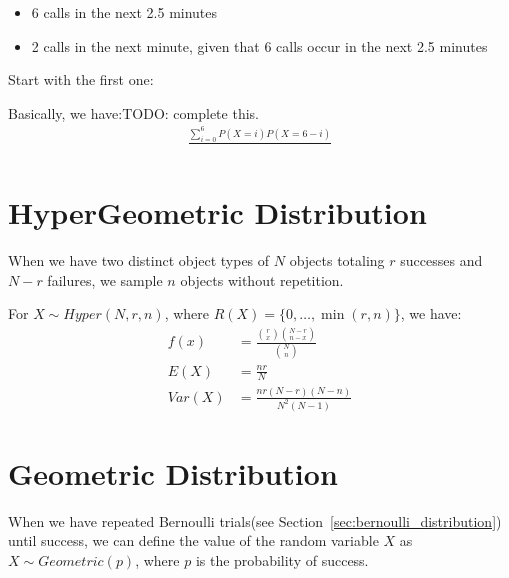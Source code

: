                     \begin{itemize}
                        \item 6 calls in the next 2.5 minutes
                        \item 2 calls in the next minute, given that 6 calls occur in the next 2.5 minutes
                    \end{itemize}

                    Start with the first one:

                    Basically, we have:TODO: complete this.
                    \begin{align*}
                        \frac
                        {\sum_{i=0}^{6} P(X = i)P(X = 6-i)}{}
                    \end{align*}
            \section{HyperGeometric Distribution} %
            \label{sec:hypergeometric_distribution}
                When we have two distinct object types of $N$ objects totaling $r$ successes and $N - r$ failures, we sample $n$ objects without repetition.

                For $X \sim Hyper(N, r, n)$, where $R(X) = \{  0, \ldots, \min(r, n) \}$, we have:
                \begin{align*}
                    f(x) &= \frac{{r \choose x} {N - r \choose n - x}}{{N \choose n}} \\
                    E(X) &= \frac{nr}{N} \\
                    Var(X) &= \frac{nr(N - r)(N - n)}{N^2 (N - 1)}
                \end{align*}
            \section{Geometric Distribution} %
            \label{sec:geometric_distribution}
                When we have repeated Bernoulli trials(see Section~\ref{sec:bernoulli_distribution}) until success, we can define the value of the random variable $X$ as $X \sim Geometric(p)$, where $p$ is the probability of success.

